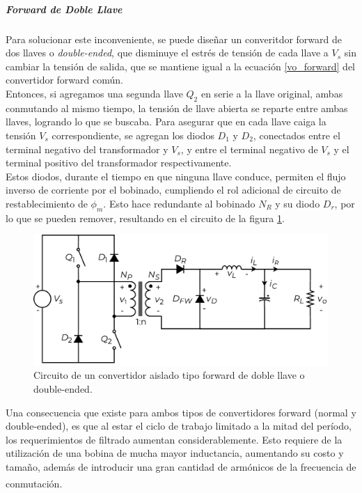 \subparagraph{Forward de Doble Llave}

Para solucionar este inconveniente, se puede diseñar un converitdor forward de dos llaves o \textit{double-ended}, que disminuye el estrés de tensión de cada llave a $V_s$ sin cambiar la tensión de salida, que se mantiene igual a la ecuación \ref{vo_forward} del convertidor forward común.\\

Entonces, si agregamos una segunda llave $Q_2$ en serie a la llave original, ambas conmutando al mismo tiempo, la tensión de llave abierta se reparte entre ambas llaves, logrando lo que se buscaba. Para asegurar que en cada llave caiga la tensión $V_s$ correspondiente, se agregan los diodos $D_1$ y $D_2$, conectados entre el terminal negativo del transformador y $V_s$, y entre el terminal negativo de $V_s$ y el terminal positivo del transformador respectivamente.\\

Estos diodos, durante el tiempo en que ninguna llave conduce, permiten el flujo inverso de corriente por el bobinado, cumpliendo el rol adicional de circuito de restablecimiento de $\phi_m$. Esto hace redundante al bobinado $N_R$ y su diodo $D_r$, por lo que se pueden remover, resultando en el circuito de la figura \ref{forward_doubleended}.\\

\begin{figure}[H]
    \centering
    \includegraphics[scale=0.6]{Imagenes/Forward Double-Ended.pdf}
    \caption{Circuito de un convertidor aislado tipo forward de doble llave o double-ended.}
    \label{forward_doubleended}
\end{figure}

Una consecuencia que existe para ambos tipos de convertidores forward (normal y double-ended), es que al estar el ciclo de trabajo limitado a la mitad del período, los requerimientos de filtrado aumentan considerablemente. Esto requiere de la utilización de una bobina de mucha mayor inductancia, aumentando su costo y tamaño, además de introducir una gran cantidad de armónicos de la frecuencia de conmutación.\textsuperscript{\cite{SoftSwitchPWM}}\\

